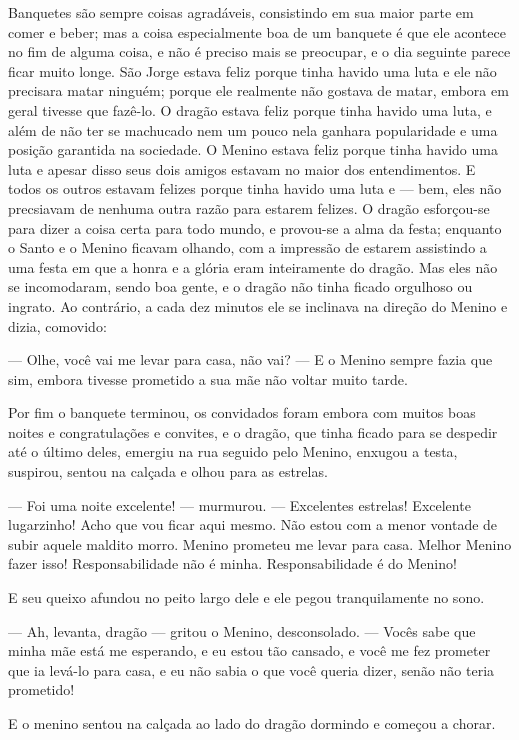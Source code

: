 Banquetes são sempre coisas agradáveis, consistindo em sua maior parte
em comer e beber; mas a coisa especialmente boa de um banquete é que
ele acontece no fim de alguma coisa, e não é preciso mais se
preocupar, e o dia seguinte parece ficar muito longe. São Jorge
estava feliz porque tinha havido uma luta e ele não precisara matar
ninguém; porque ele realmente não gostava de matar, embora em geral
tivesse que fazê-lo. O dragão estava feliz porque tinha havido uma
luta, e além de não ter se machucado nem um pouco nela ganhara
popularidade e uma posição garantida na sociedade. O Menino estava
feliz porque tinha havido uma luta e apesar disso seus dois amigos
estavam no maior dos entendimentos. E todos os outros estavam felizes
porque tinha havido uma luta e — bem, eles não precsiavam de nenhuma
outra razão para estarem felizes. O dragão esforçou-se para dizer a
coisa certa para todo mundo, e provou-se a alma da festa; enquanto o
Santo e o Menino ficavam olhando, com a impressão de estarem
assistindo a uma festa em que a honra e a glória eram inteiramente do
dragão. Mas eles não se incomodaram, sendo boa gente, e o dragão não
tinha ficado orgulhoso ou ingrato. Ao contrário, a cada dez minutos
ele se inclinava na direção do Menino e dizia, comovido:

— Olhe, você vai me levar para casa, não vai? — E o Menino sempre
fazia que sim, embora tivesse prometido a sua mãe não voltar muito
tarde.

Por fim o banquete terminou, os convidados foram embora com muitos
boas noites e congratulações e convites, e o dragão, que tinha ficado
para se despedir até o último deles, emergiu na rua seguido pelo
Menino, enxugou a testa, suspirou, sentou na calçada e olhou para as
estrelas.

— Foi uma noite excelente! — murmurou. — Excelentes estrelas!
Excelente lugarzinho! Acho que vou ficar aqui mesmo. Não estou com a
menor vontade de subir aquele maldito morro. Menino prometeu me levar
para casa. Melhor Menino fazer isso! Responsabilidade não é minha.
Responsabilidade é do Menino!

E seu queixo afundou no peito largo dele e ele pegou tranquilamente no
sono.

— Ah, levanta, dragão — gritou o Menino, desconsolado. — Vocês sabe
que minha mãe está me esperando, e eu estou tão cansado, e você me
fez prometer que ia levá-lo para casa, e eu não sabia o que você
queria dizer, senão não teria prometido! 

E o menino sentou na calçada ao lado do dragão dormindo e começou a
chorar.

